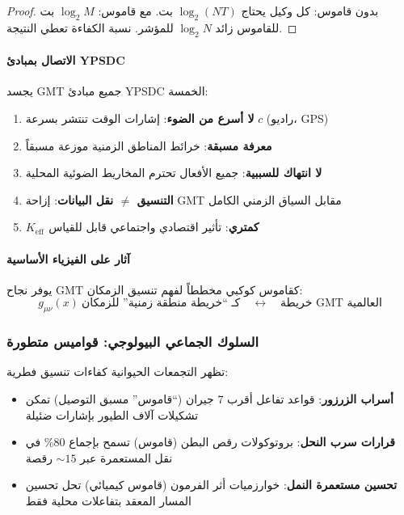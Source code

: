 \documentclass[11pt,a4paper]{article}
\begin{document}
	\begin{proof}
		بدون قاموس: كل وكيل يحتاج $\log_2(NT)$ بت. مع قاموس: $\log_2 M$ بت للقاموس زائد $\log_2 N$ للمؤشر. نسبة الكفاءة تعطي النتيجة.
	\end{proof}
	
	\paragraph{الاتصال بمبادئ YPSDC}
	يجسد GMT جميع مبادئ YPSDC الخمسة:
	\begin{enumerate}
		\item \textbf{لا أسرع من الضوء}: إشارات الوقت تنتشر بسرعة $c$ (راديو، GPS)
		\item \textbf{معرفة مسبقة}: خرائط المناطق الزمنية موزعة مسبقاً
		\item \textbf{لا انتهاك للسببية}: جميع الأفعال تحترم المخاريط الضوئية المحلية
		\item \textbf{التنسيق $\neq$ نقل البيانات}: إزاحة GMT مقابل السياق الزمني الكامل
		\item \textbf{$K_{\mathrm{eff}}$ كمتري}: تأثير اقتصادي واجتماعي قابل للقياس
	\end{enumerate}
	
	\paragraph{آثار على الفيزياء الأساسية}
	يوفر نجاح GMT كقاموس كوكبي مخططاً لفهم تنسيق الزمكان:
	\begin{equation}
		g_{\mu\nu}(x) \ \text{كـ ``خريطة منطقة زمنية'' للزمكان} \quad \leftrightarrow \quad \text{خريطة GMT العالمية}
	\end{equation}
	
	\subsubsection{السلوك الجماعي البيولوجي: قواميس متطورة}
	تظهر التجمعات الحيوانية كفاءات تنسيق فطرية:
	\begin{itemize}
		\item \textbf{أسراب الزرزور}: قواعد تفاعل أقرب 7 جيران (``قاموس'' مسبق التوصيل) تمكن تشكيلات آلاف الطيور بإشارات ضئيلة
		\item \textbf{قرارات سرب النحل}: بروتوكولات رقص البطن (قاموس) تسمح بإجماع 80\% في نقل المستعمرة عبر $\sim 15$ رقصة
		\item \textbf{تحسين مستعمرة النمل}: خوارزميات أثر الفرمون (قاموس كيميائي) تحل تحسين المسار المعقد بتفاعلات محلية فقط
	\end{itemize}
	
\end{document}
